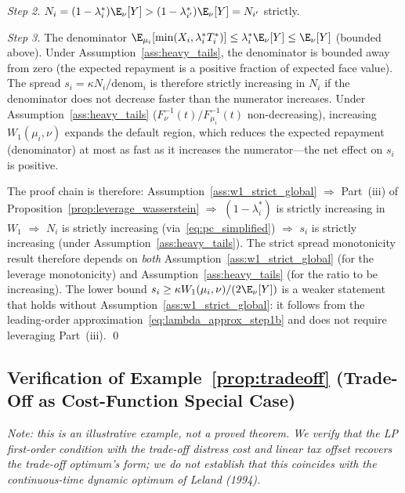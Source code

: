 \emph{Step 2.} $N_i = (1-\lambda_i^*)\E_\nu[Y] > (1-\lambda_{i'}^*)\E_\nu[Y] = N_{i'}$ strictly.

\emph{Step 3.} The denominator $\E_{\mu_i}[\min(X_i,\lambda_i^* T_i^*)] \leq \lambda_i^*\E_\nu[Y] \leq \E_\nu[Y]$ (bounded above). Under Assumption~\ref{ass:heavy_tails}, the denominator is bounded away from zero (the expected repayment is a positive fraction of expected face value). The spread $s_i = \kappa N_i / \mathrm{denom}_i$ is therefore strictly increasing in $N_i$ if the denominator does not decrease faster than the numerator increases. Under Assumption~\ref{ass:heavy_tails} ($F_\nu^{-1}(t)/F_{\mu_i}^{-1}(t)$ non-decreasing), increasing $W_1(\mu_i,\nu)$ expands the default region, which reduces the expected repayment (denominator) at most as fast as it increases the numerator---the net effect on $s_i$ is positive.

The proof chain is therefore: Assumption~\ref{ass:w1_strict_global} $\Rightarrow$ Part~(iii) of Proposition~\ref{prop:leverage_wasserstein} $\Rightarrow$ $(1-\lambda_i^*)$ is strictly increasing in $W_1$ $\Rightarrow$ $N_i$ is strictly increasing (via~\eqref{eq:pc_simplified}) $\Rightarrow$ $s_i$ is strictly increasing (under Assumption~\ref{ass:heavy_tails}). The strict spread monotonicity result therefore depends on \emph{both} Assumption~\ref{ass:w1_strict_global} (for the leverage monotonicity) and Assumption~\ref{ass:heavy_tails} (for the ratio to be increasing). The lower bound $s_i \geq \kappa W_1(\mu_i,\nu)/(2\E_\nu[Y])$ is a weaker statement that holds without Assumption~\ref{ass:w1_strict_global}: it follows from the leading-order approximation~\eqref{eq:lambda_approx_step1b} and does not require leveraging Part~(iii). \qed

\subsection*{Verification of Example~\ref{prop:tradeoff} (Trade-Off as Cost-Function Special Case)}

\emph{Note: this is an illustrative example, not a proved theorem. We verify that the LP first-order condition with the trade-off distress cost and linear tax offset recovers the trade-off optimum's form; we do not establish that this coincides with the continuous-time dynamic optimum of Leland (1994).}

